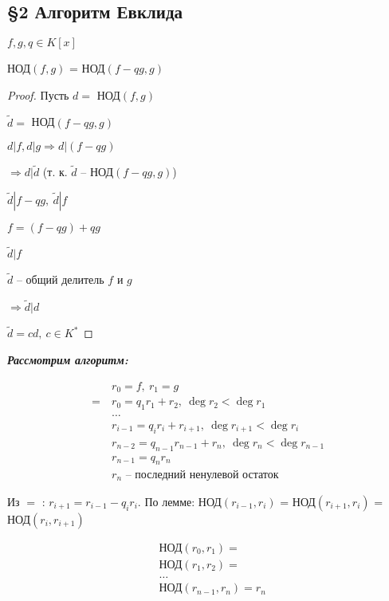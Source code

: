     \subsection*{\S2 Алгоритм Евклида}

    \begin{lemma}
        $f, g, q \in K[x]$
        \par \quad НОД$(f, g)$ = НОД$(f - qg, g)$
    \end{lemma}

    \begin{proof}
        Пусть $d =$ НОД$(f, g)$
        \par \quad $\tilde d =$ НОД$(f - qg, g)$
        \par \quad $d | f, d | g \Rightarrow d | (f-qg)$
        \par \quad $\Rightarrow d | \tilde d$ (т. к. $\tilde d$ -- НОД$(f - qg, g)$)
        \par \quad $\tilde d | f - qg, \ \tilde d | f$
        \par \quad $f = (f - qg) + qg$
        \par \quad $\tilde d | f$
        \par \quad $\tilde d$ -- общий делитель $f$ и $g$
        \par \quad $\Rightarrow \tilde d | d$
        \par \quad $\tilde d = cd, \ c \in K^*$
    \end{proof}

    \pagebreak
    \textbf{\textit{Рассмотрим алгоритм:}}

    \begin{align*}
        &r_0 = f, \ r_1 = g \\
        \boxed{=} \ &r_0 = q_1 r_1 + r_2, \ \deg r_2 < \deg r_1 \\
        &\dots \\
        &r_{i-1} = q_i r_i + r_{i+1}, \ \deg r_{i+1} < \deg r_i \\
        &r_{n-2} = q_{n-1} r_{n-1} + r_{n}, \ \deg r_n < \deg r_{n-1} \\
        &r_{n-1} = q_n r_n \\
        &r_n \text{ -- последний ненулевой остаток}
    \end{align*}

    \par \quad Из $\boxed{=}$ : $r_{i+1} = r_{i-1} - q_i r_i$. По лемме: НОД$(r_{i-1}, r_i)$ = НОД$(r_{i+1}, r_i)$ = НОД$(r_i, r_{i+1})$

    \begin{align*}
        &\text{НОД}(r_0, r_1) = \\
        &\text{НОД}(r_1, r_2) = \\
        &\dots \\
        &\text{НОД}(r_{n-1}, r_n) = r_n
    \end{align*}

